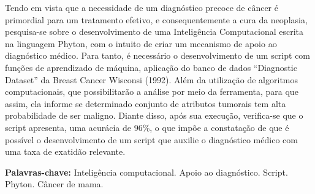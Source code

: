 Tendo em vista que a necessidade de um diagnóstico precoce de câncer é primordial para um tratamento efetivo,
e consequentemente a cura da neoplasia,
pesquisa-se sobre o desenvolvimento de uma Inteligência Computacional escrita na linguagem Phyton,
com o intuito de criar um mecanismo de apoio ao diagnóstico médico.
Para tanto, é necessário o desenvolvimento de um script com funções de aprendizado de máquina,
aplicação do banco de dados “Diagnostic Dataset” da Breast Cancer Wisconsi (1992).
Além da utilização de algoritmos computacionais,
que possibilitarão a análise por meio da ferramenta, para que assim,
ela informe se determinado conjunto de atributos tumorais tem alta probabilidade de ser maligno.
Diante disso, após sua execução, verifica-se que o script apresenta, uma acurácia de 96\%,
o que impõe a constatação de que é possível o desenvolvimento de um script que auxilie o diagnóstico médico com uma taxa de exatidão relevante.
\vspace{\onelineskip}

\noindent

\textbf{Palavras-chave:} Inteligência computacional. Apoio ao diagnóstico. Script. Phyton. Câncer de mama.
